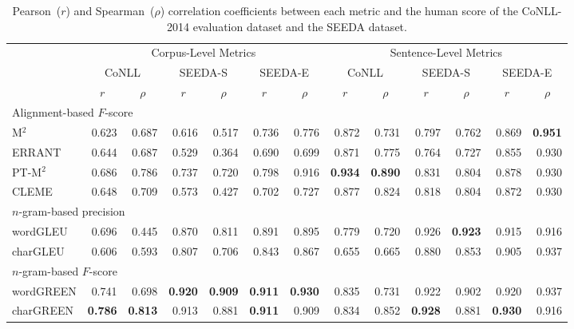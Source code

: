 \documentclass[11pt]{article}
\begin{document}
\begin{table*}[!t]
    \centering
    \tabcolsep 4pt
    \begin{tabular}{lrrrrrrrrrrrr}
        \hline
        & \multicolumn{6}{c}{Corpus-Level Metrics}
        & \multicolumn{6}{c}{Sentence-Level Metrics} \\
        & \multicolumn{2}{c}{CoNLL}
        & \multicolumn{2}{c}{SEEDA-S}
        & \multicolumn{2}{c}{SEEDA-E}
        & \multicolumn{2}{c}{CoNLL}
        & \multicolumn{2}{c}{SEEDA-S}
        & \multicolumn{2}{c}{SEEDA-E} \\
        & \multicolumn{1}{c}{$r$} & \multicolumn{1}{c}{$\rho$}
        & \multicolumn{1}{c}{$r$} & \multicolumn{1}{c}{$\rho$}
        & \multicolumn{1}{c}{$r$} & \multicolumn{1}{c}{$\rho$}
        & \multicolumn{1}{c}{$r$} & \multicolumn{1}{c}{$\rho$}
        & \multicolumn{1}{c}{$r$} & \multicolumn{1}{c}{$\rho$}
        & \multicolumn{1}{c}{$r$} & \multicolumn{1}{c}{$\rho$} \\
        \hline
        \multicolumn{13}{l}{Alignment-based $F$-score} \\
        M${}^2$ &
        0.623 & 0.687 & 0.616 & 0.517 & 0.736 & 0.776 &
        0.872 & 0.731 & 0.797 & 0.762 & 0.869 & \textbf{0.951} \\
        ERRANT & 
        0.644 & 0.687 & 0.529 & 0.364 & 0.690 & 0.699 & 
        0.871 & 0.775 & 0.764 & 0.727 & 0.855 & 0.930 \\
        PT-M${}^2$ &
        0.686 & 0.786 & 0.737 & 0.720 & 0.798 & 0.916 &
        \textbf{0.934} & \textbf{0.890} & 0.831 & 0.804 & 0.878 & 0.930 \\
        CLEME &
        0.648 & 0.709 & 0.573 & 0.427 & 0.702 & 0.727 &
        0.877 & 0.824 & 0.818 & 0.804 & 0.872 & 0.930 \\
        \hline
        \multicolumn{13}{l}{$n$-gram-based precision} \\
        wordGLEU &
        0.696 & 0.445 & 0.870 & 0.811 & 0.891 & 0.895 &
        0.779 & 0.720 & 0.926 & \textbf{0.923} & 0.915 & 0.916 \\
        charGLEU &
        0.606 & 0.593 & 0.807 & 0.706 & 0.843 & 0.867 &
        0.655 & 0.665 & 0.880 & 0.853 & 0.905 & 0.937 \\
        \hline
        \multicolumn{4}{l}{$n$-gram-based $F$-score} \\
        wordGREEN &
        0.741 & 0.698 & \textbf{0.920} & \textbf{0.909} & \textbf{0.911} & \textbf{0.930} &
        0.835 & 0.731 & 0.922 & 0.902 & 0.920 & 0.937 \\
        charGREEN &
        \textbf{0.786} & \textbf{0.813} & 0.913 & 0.881 & \textbf{0.911} & 0.909 &
        0.834 & 0.852 & \textbf{0.928} & 0.881 & \textbf{0.930} & 0.916 \\
        \hline
    \end{tabular}
    \caption{Pearson~($r$) and Spearman~($\rho$) correlation coefficients between each metric and the human score of the CoNLL-2014 evaluation dataset and the SEEDA dataset.}
    \label{tab:correlations}
\end{table*}
\end{document}
